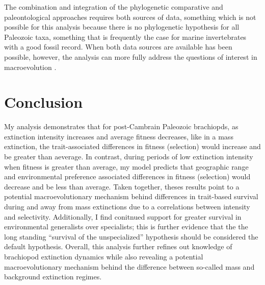 \documentclass[11pt]{article}
\begin{document}
The combination and integration of the phylogenetic comparative and paleontological approaches requires both sources of data, something which is not possible for this analysis because there is no phylogenetic hypothesis for all Paleozoic taxa, something that is frequently the case for marine invertebrates with a good fossil record. When both data sources are available has been possible, however, the analysis can more fully address the questions of interest in macroevolution \citep{Smits2015,Slater2013a,Slater2015b,Simpson2011,Tomiya2013,Slater2012,Raia2013c,Raia2012f,Harnik2014,Fritz2013a}.

\section*{Conclusion}

My analysis demonstrates that for post-Cambrain Paleozoic brachiopds, as extinction intensity increases and average fitness decreases, like in a mass extinction, the trait-associated differences in fitness (selection) would increase and be greater than aeverage. In contrast, during periods of low extinction intensity when fitness is greater than average, my model predicts that geographic range and environmental preference associated differences in fitness (selection) would decrease and be less than average. Taken together, theses results point to a potential macroevolutionary mechanism behind differences in trait-based survival during and away from mass extinctions due to a correlations between intensity and selectivity. Additionally, I find conitnued support for greater survival in environmental generalists over specialists; this is further evidence that the the long standing ``survival of the unspecialized'' hypothesis \citep{Liow2004a,Liow2007b,Simpson1944,Simpson1953,Smits2015,Nurnberg2015,Nurnberg2013a, Baumiller1993} should be considered the default hypothesis. Overall, this analysis further refines out knowledge of brachiopod extinction dynamics while also revealing a potential macroevolutionary mechanism behind the difference between so-called mass and background extinction regimes.






\end{document}
